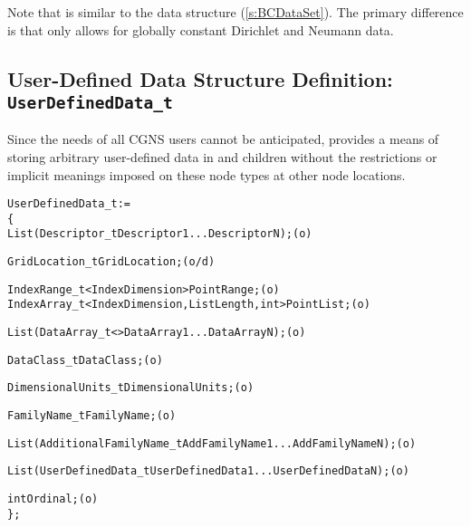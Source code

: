 Note that  is similar to the data structure
 (\autoref{s:BCDataSet}).  The primary difference is that
 only allows for globally constant Dirichlet and
Neumann data.

\subsection{User-Defined Data Structure Definition: \texttt{UserDefinedData\_t}}
\label{s:UserDefinedData}

Since the needs of all CGNS users cannot be anticipated,
 provides a means of storing arbitrary
user-defined data in  and 
children without the restrictions or implicit meanings imposed on these
node types at other node locations.

\begin{alltt}
  UserDefinedData\_t :=
    \{
    List( Descriptor\_t Descriptor1 ... DescriptorN ) ;                      (o)

    GridLocation\_t GridLocation ;                                           (o/d)

    IndexRange\_t<IndexDimension> PointRange ;                               (o)
    IndexArray\_t<IndexDimension, ListLength, int> PointList ;               (o)

    List( DataArray\_t<> DataArray1 ... DataArrayN ) ;                       (o)

    DataClass\_t DataClass ;                                                 (o)

    DimensionalUnits\_t DimensionalUnits ;                                   (o)

    FamilyName\_t FamilyName ;                                               (o)

    List( AdditionalFamilyName\_t AddFamilyName1 ... AddFamilyNameN ) ;      (o)

    List( UserDefinedData\_t UserDefinedData1 ... UserDefinedDataN ) ;       (o)

    int Ordinal ;                                                           (o)
    \} ;
\end{alltt}

